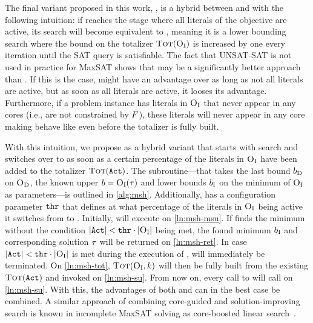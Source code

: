 The final variant proposed in this work, \msh{}, is a hybrid between \msu{} and \satunsat{} with the following intuition:
if \msu{}  reaches the stage where all literals of the objective are active, its search will become equivalent to \unsatsat{}, meaning it is a lower bounding search where the bound on the totalizer $\textsc{Tot}(\textsc{O}_{\text{I}})$ is increased by one every iteration until the SAT query is satisfiable.
The fact that UNSAT-SAT is not used in practice for MaxSAT shows that \satunsat{} may be a significantly better approach than \unsatsat{}.
If this is the case, \msu{} might have an advantage over \satunsat{} as long as not all literals are active, but as soon as all literals are active, it looses its advantage.
Furthermore, if a problem instance has literals in $\textsc{O}_{\text{I}}$ that never appear in any cores (i.e., are not constrained by $F$), these literals will never appear in any core making \msu{} behave like \unsatsat{} even before the totalizer is fully built.

With this intuition, we propose \msh{} as a hybrid variant that starts with \msu{} search and switches over to \satunsat{} as soon as a certain percentage of the literals in $\textsc{O}_{\text{I}}$ have been added to the totalizer $\textsc{Tot}(\texttt{Act})$.
The subroutine---that takes the last bound $b_{\text{D}}$ on $\textsc{O}_{\text{D}}$, the known upper $b=\textsc{O}_{\text{I}}(\tau)$ and lower bounds $b_{\text{I}}$ on the minimum of $\textsc{O}_{\text{I}}$ as parameters---is outlined in \cref{alg:msh}.
Additionally, \msh{} has a configuration parameter $\texttt{thr}$ that defines at what percentage of the literals in $\textsc{O}_{\text{I}}$ being active it switches from \msu{} to \satunsat{}.
Initially, \msh{} will execute \msu{} on \cref{ln:msh-msu}.
If \msu{} finds the minimum without the condition $|\texttt{Act}| < \texttt{thr} \cdot |\textsc{O}_{\text{I}}|$ being met, the found minimum $b_{\text{I}}$ and corresponding solution $\tau$ will be returned on \cref{ln:msh-ret}.
In case $|\texttt{Act}| < \texttt{thr} \cdot |\textsc{O}_{\text{I}}|$ is met during the execution of \msu{}, \msu{} will immediately be terminated.
On \cref{ln:msh-tot}, $\textsc{Tot}(\textsc{O}_{\text{I}},k)$ will then be fully built from the existing $\textsc{Tot}(\texttt{Act})$ and \satunsat{} invoked on \cref{ln:msh-su}.
From now on, every call to \msh{} will call \satunsat{} on \cref{ln:msh-su}.
With this, the advantages of both \msu{} and \satunsat{} can in the best case be combined.
A similar approach of combining core-guided and solution-improving search is known in incomplete MaxSAT solving as core-boosted linear search~\autocite{DBLP:conf/cpaior/BergDS19}.

